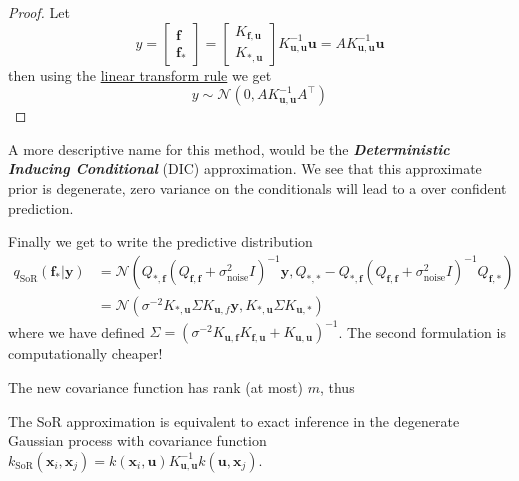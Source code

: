 \documentclass[10pt]{elegantbook}
\newcommand{\mydefination}[1]{\textbf{\textit{\textcolor{structurecolor}{#1}}}}
\begin{document}
\begin{proof}
    Let
    \[
    y = 
    \begin{bmatrix}
        \mathbf f \\
        \mathbf f_*
    \end{bmatrix} = 
    \begin{bmatrix}
        K_{\mathbf{f,u}} \\
        K_{*, \mathbf u}
    \end{bmatrix} K_{\mathbf{u,u}}^{-1} \mathbf{u} = 
    A K_{\mathbf{u,u}}^{-1} \mathbf{u}
    \]
    then using the \href{https://statproofbook.github.io/P/mvn-ltt}{linear transform rule} we get
    \[ y \sim \mathcal N (0, A K_{\mathbf{u,u}}^{-1} A^{\top}) \]
\end{proof}

A more descriptive name for this method, would be the
\mydefination{Deterministic Inducing Conditional} (DIC) approximation. We see that this approximate prior is
degenerate, zero variance on the conditionals will lead to a over confident prediction.

Finally we get to write the predictive distribution
\begin{equation}
    \begin{aligned}
    q_{\text{SoR}}(\mathbf f_* | \mathbf y) &= \mathcal N \left (
        Q_{*, \mathbf f} (Q_{\mathbf f, \mathbf f} + \sigma_{\text{noise}}^2 I)^{-1} \mathbf y,
        Q_{*, *} - Q_{*, \mathbf f} (Q_{\mathbf f, \mathbf f} + \sigma_{\text{noise}}^2 I)^{-1} Q_{\mathbf f, *}
        \right ) \\
        &= \mathcal N \left (
            \sigma^{-2} K_{*, \mathbf u} \Sigma K_{\mathbf u, f} \mathbf y,
            K_{*, \mathbf u} \Sigma K_{\mathbf u, *}
            \right )
    \end{aligned}
\end{equation}
where we have defined $\Sigma = (\sigma^{-2} K_{\mathbf u, \mathbf f} K_{\mathbf f, \mathbf u} + K_{\mathbf u, \mathbf u})^{-1}$. The 
second formulation is computationally cheaper!

The new covariance function has rank (at most) $m$, thus

\begin{remark}
    The SoR approximation is equivalent to exact inference in the degenerate Gaussian
process with covariance function $k_{\text{SoR}}(\mathbf x_i, \mathbf x_j) = k(\mathbf x_i, \mathbf u) K_{\mathbf{u,u}}^{-1} k(\mathbf u, \mathbf x_j)$.
\end{remark}
\end{document}
